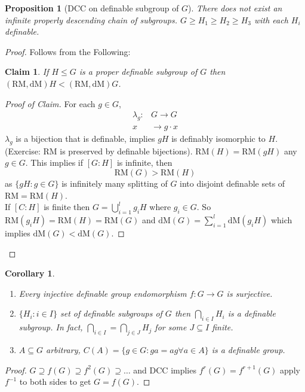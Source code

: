 \documentclass[letterpaper, 12pt]{article}
\newcommand{\RM}{\mbox{RM}}
\newcommand{\dM}{\mbox{dM}}
\theoremstyle{stdthm}
\newtheorem{cor}[thm]{Corollary}
\newtheorem{prop}[thm]{Proposition}
\theoremstyle{stddef}
\theoremstyle{stdnonum}
\newtheorem{claim}{Claim}
\theoremstyle{stdqands}
\theoremstyle{stdbold}
\begin{document}
\begin{prop}[DCC on definable subgroup of $G$]
There does not exist an infinite properly descending chain of subgroups. $G \geq H_1 \geq H_2 \geq H_3$ with each $H_i$ definable. 
\end{prop}

\begin{proof}
Follows from the Following:
\begin{claim}
If $H\leq G$ is a proper definable subgroup of $G$ then $(\RM,\dM)H < (\RM,\dM)G$. 
\end{claim}

\begin{proof}[Proof of Claim]
For each $g \in G$, 
\begin{align*}
\lambda_g: &G\to G \\
x &\to g\cdot x
\end{align*}
$\lambda_g$ is a bijection that is definable, implies $gH$ is definably isomorphic to $H$. (Exercise: $\RM$ is preserved by definable bijections). $\RM(H) = \RM(gH)$ any $g \in G$. This implies if $[G:H]$ is infinite, then 
\[ \RM(G) > \RM(H) \] 
as $\{gH: g \in G\}$ is infinitely many splitting of $G$ into disjoint definable sets of $\RM = \RM(H)$. \\

If $[C:H]$ is finite then $G = \bigcup_{i=1}^l g_iH$ where $g_i \in G$. So $\RM(g_i H)  = \RM(H) = \RM(G)$ and $\dM(G) = \sum_{i=1}^l \dM(g_iH)$ which implies $\dM(G) < \dM(G)$. 
\end{proof}

\end{proof}


\begin{cor}
\begin{enumerate}
\item Every injective definable group endomorphism $f:G\to G$ is surjective. 
\item $\{H_i: i \in I\}$ set of definable subgroups of $G$ then $\bigcap_{i\in I} H_i$ is a definable subgroup. In fact, $\bigcap_{i\in I} = \bigcap_{j\in J} H_j$ for some $J \subseteq I$ finite.
\item $A\subseteq G$ arbitrary, $C(A) = \{g \in G:ga=ag \forall a\in A\}$ is a definable group.  
\end{enumerate}

\end{cor}

\begin{proof}
$G \supseteq f(G) \supseteq f^2(G) \supseteq \dots$ and DCC implies $f^r(G) = f^{r+1}(G)$ apply $f^{-1}$ to both sides to get $G = f(G)$.  
\end{proof}
\end{document}
